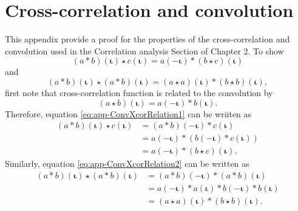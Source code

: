 \documentclass[]{article}
\begin{document}
\section{Cross-correlation and convolution}\label{ap:CorrelationAnalysis}
This appendix provide a proof for the properties of the cross-correlation and convolution used in the Correlation analysis Section of Chapter 2. To show 
\begin{equation}\label{eq:app-ConvXcorRelation1}
 \left(a \ast b \right)\left(\boldsymbol\iota\right)  \star c\left(\boldsymbol\iota\right)  = a\left(-\boldsymbol\iota\right)\ast\left(b \star c\right)\left(\boldsymbol\iota\right)
\end{equation}
and
\begin{equation}\label{eq:app-ConvXcorRelation2}
(a \ast b)(\boldsymbol \iota) \star (a \ast b)(\boldsymbol\iota)=(a \star a)(\boldsymbol\iota)\ast(b \star b)(\boldsymbol\iota),
\end{equation}
first note that cross-correlation function is related to the convolution by \cite{Yarlagadda2009}
\begin{equation}\label{eq:app-ConvXcorRelation}
 \left(a \star b\right)\left(\boldsymbol\iota\right)= a\left(-\boldsymbol\iota\right)\ast b\left(\boldsymbol\iota\right).
\end{equation}
Therefore, equation \eqref{eq:app-ConvXcorRelation1} can be wriiten as
\begin{align}
 \left(a \ast b\right)\left(\boldsymbol\iota\right) \star c\left(\boldsymbol\iota\right)&= \left(a \ast b\right)\left(-\boldsymbol\iota \right)\ast c\left(\boldsymbol\iota\right) \nonumber \\
&=a\left(-\boldsymbol\iota\right)\ast \left(b\left(-\boldsymbol\iota\right) \ast c\left(\boldsymbol\iota\right)\right)\nonumber \\
&=a\left(-\boldsymbol\iota\right)\ast\left(b\star c\right)\left(\boldsymbol\iota\right).
\end{align}
Similarly, equation \eqref{eq:app-ConvXcorRelation2} can be written as
\begin{align}
 (a \ast b)(\boldsymbol \iota) \star (a \ast b)(\boldsymbol\iota)&=(a \ast b)(-\boldsymbol\iota) \ast (a \ast b)(\boldsymbol\iota) \nonumber \\
&=a(-\boldsymbol\iota)\ast a(\boldsymbol\iota) \ast b(-\boldsymbol\iota)\ast b(\boldsymbol\iota) \nonumber \\
&=(a \star a)(\boldsymbol\iota)\ast(b \star b)(\boldsymbol\iota).
\end{align}
\end{document}
